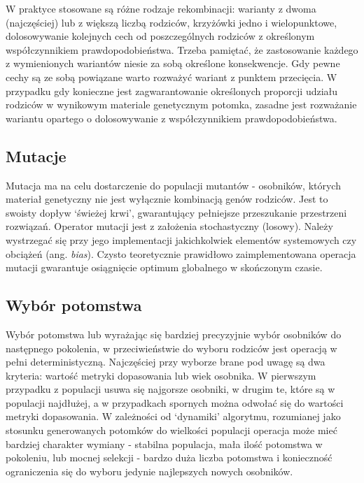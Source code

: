 \documentclass[a4paper,11pt]{article}
\begin{document}
    \bigskip

    W praktyce stosowane są różne rodzaje rekombinacji: warianty z dwoma (najczęściej) lub z większą liczbą rodziców, krzyżówki jedno i wielopunktowe, dolosowywanie kolejnych cech od poszczególnych rodziców z określonym współczynnikiem prawdopodobieństwa. Trzeba pamiętać, że zastosowanie każdego z wymienionych wariantów niesie za sobą określone konsekwencje. Gdy pewne cechy są ze sobą powiązane warto rozważyć wariant z punktem przecięcia. W przypadku gdy konieczne jest zagwarantowanie określonych proporcji udziału rodziców w wynikowym materiale genetycznym potomka, zasadne jest rozważanie wariantu opartego o dolosowywanie z współczynnikiem prawdopodobieństwa\cite{IntroductionToEvolutionaryComputing2015}.

    \subsection{Mutacje}

    Mutacja ma na celu dostarczenie do populacji mutantów - osobników, których materiał genetyczny nie jest wyłącznie kombinacją genów rodziców. Jest to swoisty dopływ `świeżej krwi', gwarantujący pełniejsze przeszukanie przestrzeni rozwiązań. Operator mutacji jest z założenia stochastyczny (losowy). Należy wystrzegać się przy jego implementacji jakichkolwiek elementów systemowych czy obciążeń (ang. \textit{bias}). Czysto teoretycznie prawidłowo zaimplementowana operacja mutacji gwarantuje osiągnięcie optimum globalnego w skończonym czasie\cite{IntroductionToEvolutionaryComputing2015}.

    \subsection{Wybór potomstwa}

    Wybór potomstwa lub wyrażając się bardziej precyzyjnie wybór osobników do następnego pokolenia, w przeciwieństwie do wyboru rodziców jest operacją w pełni deterministyczną. Najczęściej przy wyborze brane pod uwagę są dwa kryteria: wartość metryki dopasowania lub wiek osobnika. W pierwszym przypadku z populacji usuwa się najgorsze osobniki, w drugim te, które są w populacji najdłużej, a w przypadkach spornych można odwołać się do wartości metryki dopasowania. W zależności od `dynamiki' algorytmu, rozumianej jako stosunku generowanych potomków do wielkości populacji operacja może mieć bardziej charakter wymiany - stabilna populacja, mała ilość potomstwa w pokoleniu, lub mocnej selekcji - bardzo duża liczba potomstwa i konieczność ograniczenia się do wyboru jedynie najlepszych nowych osobników\cite{IntroductionToEvolutionaryComputing2015}.
\end{document}
